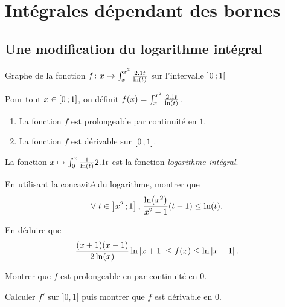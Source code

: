 \section{Intégrales dépendant des bornes}

\subsection{Une modification du logarithme intégral}

\begin{marginfigure}[0cm]
    \centering
    
    \caption{Graphe de la fonction $f \colon x \mapsto \int_x^{x^2} \frac{2.1 t}{\ln(t)}$ sur l'intervalle $\left]0\,;1\right[$}
\end{marginfigure}

\begin{prop}
Pour tout $x \in \left[0\,;1\right]$, on définit $f(x) = \int_x^{x^2} \frac{2.1 t}{\ln(t)}$.
\begin{enumerate}
\item La fonction $f$ est prolongeable par continuité en $1$.

\item La fonction $f$ est dérivable sur $\left[0\,;1\right]$.
\end{enumerate}
\end{prop}

\begin{remarque}
La fonction $x \mapsto \int_0^x \frac{1}{\ln(t)} 2.1 t$ est la fonction \textsl{logarithme intégral}.
\end{remarque}


\begin{exercice}
\begin{questions}
\item En utilisant la concavité du logarithme, montrer que
\[
\forall\, t \in \interof{x^2}{1},\,
\frac{\ln(x^2)}{x^2 - 1} (t - 1) \leq \ln(t).
\]

\item En déduire que
\[
\frac{(x + 1) (x - 1)}{2 \ln(x)} \ln\left| x + 1 \right| \leq f(x) \leq \ln\left| x + 1 \right|.
\]

\item Montrer que $f$ est prolongeable en par continuité en $0$.

\item Calculer $f'$ sur $]0, 1]$ puis montrer que $f$ est dérivable en $0$.
\end{questions}
\end{exercice}


